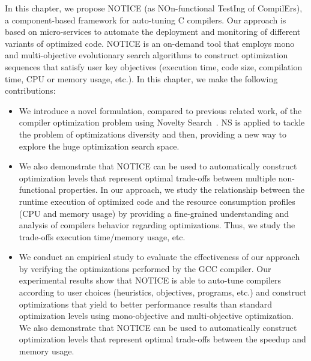 In this chapter, we propose NOTICE (as NOn-functional TestIng of CompilErs), a component-based framework for auto-tuning C compilers. Our approach is based on micro-services to automate the deployment and monitoring of different variants of optimized code. NOTICE is an on-demand tool that employs mono and multi-objective evolutionary search algorithms to construct optimization sequences that satisfy user key objectives (execution time, code size, compilation time, CPU or memory usage, etc.).
In this chapter, we make the following contributions:
\begin{itemize} 
	
	\item We introduce a novel formulation, compared to previous related work, of the compiler optimization problem using Novelty Search~\cite{lehman2008exploiting}. NS is applied to tackle the problem of optimizations diversity and then, providing a new way to explore the huge optimization search space. 
	
		
	\item We also demonstrate that NOTICE can be used to automatically construct optimization levels that represent optimal trade-offs between multiple non-functional properties. In our approach, we study the relationship between the runtime execution of optimized code and the resource consumption profiles (CPU and memory usage) by providing a fine-grained understanding and analysis of compilers behavior regarding optimizations. Thus, we study the trade-offs execution time/memory usage, etc.
	

	\item We conduct an empirical study to evaluate the effectiveness of our approach by verifying the optimizations performed by the GCC compiler.
	Our experimental results show that NOTICE is able to auto-tune compilers according to user choices (heuristics, objectives, programs, etc.) and construct optimizations that yield to better performance results than standard optimization levels using mono-objective and multi-objective optimization. We also demonstrate that NOTICE can be used to automatically construct optimization levels that represent optimal trade-offs between the speedup and memory usage.
\end{itemize}



